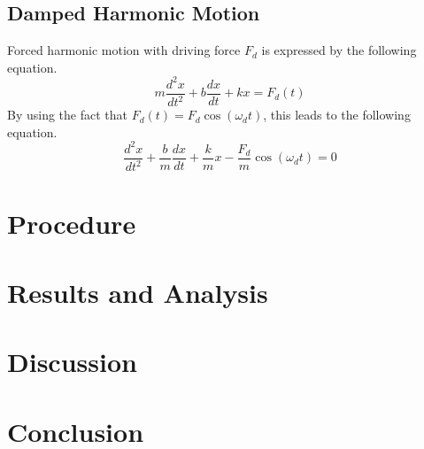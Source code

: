 \documentclass[a4paper]{article}
\begin{document}
\subsection{Damped Harmonic Motion}
Forced harmonic motion with driving force $F_d$ is expressed by the following equation.
\begin{equation*}
    m\frac{d^2x}{dt^2} + b\frac{dx}{dt} + kx = F_d(t)
\end{equation*}
By using the fact that $F_d(t) = F_d\cos(\omega_dt)$, this leads to the following equation.
\begin{equation*}
    \frac{d^2x}{dt^2} + \frac{b}{m}\frac{dx}{dt} + \frac{k}{m}x - \frac{F_d}{m}\cos(\omega_dt) = 0
\end{equation*}

\section{Procedure}

\section{Results and Analysis}

\section{Discussion}

\section{Conclusion}
\end{document}
